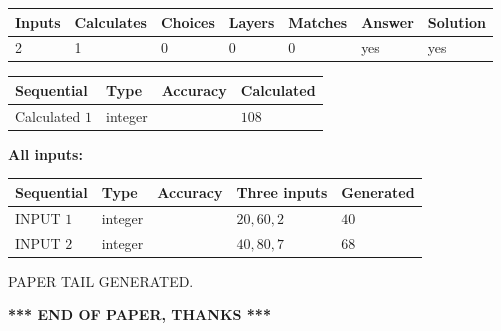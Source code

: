 \documentclass[12pt]{article}
\begin{document}
   
   
   
\noindent\begin{tabular}{|l|l|l|l|l|l|l|}
 \hline
Inputs & Calculates & Choices & Layers & Matches & Answer & Solution \\ \hline
 2  & 
 1  & 
 0
  & 
 0  & 
 0  & 
  yes & 
  yes 
  \\ \hline
 \end{tabular}
   
   
   
   
\noindent{}
   
   
  
  
\noindent\begin{tabular}{|l|l|l|l|}
\hline
 Sequential & Type & Accuracy & Calculated \\ 
\hline
 
 
  Calculated $  1 $ & integer &  & 
  $ 108 $ 
 \\  \hline  
 \end{tabular}
   
   
   
   
\noindent\vspace{0.1in}\hspace{-0.08in} {\textbf{\Large{All inputs: }}}
   
   
  
  
\noindent\begin{tabular}{|l|l|l|l|l|}
\hline
 Sequential & Type & Accuracy & Three inputs & Generated \\ 
\hline
 
 
  INPUT $  1 $ & integer &  & $
 20
 , 
 60
 , 
 2
 $ & $ 40 $ 
 \\  \hline  
 
 
  INPUT $  2 $ & integer &  & $
 40
 , 
 80
 , 
 7
 $ & $ 68 $ 
 \\  \hline  
 \end{tabular}
   
   
   
   
   
   
 \vspace{0.2in}
 
   
   
\vspace{2.0in} PAPER TAIL GENERATED.
   
   
   
   
\vspace{1.0in} 
{\textbf{\large{ *** END OF PAPER, THANKS *** }}} 
   
\end{document}
